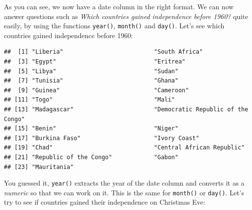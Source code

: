 \documentclass[]{gitbook}
\newenvironment{Shaded}{\begin{snugshade}}{\end{snugshade}}
\newcommand{\DecValTok}[1]{\textcolor[rgb]{0.00,0.00,0.81}{#1}}
\newcommand{\KeywordTok}[1]{\textcolor[rgb]{0.13,0.29,0.53}{\textbf{#1}}}
\newcommand{\NormalTok}[1]{#1}
\newcommand{\OperatorTok}[1]{\textcolor[rgb]{0.81,0.36,0.00}{\textbf{#1}}}
\newcommand{\StringTok}[1]{\textcolor[rgb]{0.31,0.60,0.02}{#1}}
\begin{document}
As you can see, we now have a date column in the right format. We can now answer questions such as
\emph{Which countries gained independence before 1960?} quite easily, by using the functions \texttt{year()},
\texttt{month()} and \texttt{day()}. Let's see which countries gained independence before 1960:

\begin{Shaded}
\end{Shaded}

\begin{verbatim}
##  [1] "Liberia"                          "South Africa"                    
##  [3] "Egypt"                            "Eritrea"                         
##  [5] "Libya"                            "Sudan"                           
##  [7] "Tunisia"                          "Ghana"                           
##  [9] "Guinea"                           "Cameroon"                        
## [11] "Togo"                             "Mali"                            
## [13] "Madagascar"                       "Democratic Republic of the Congo"
## [15] "Benin"                            "Niger"                           
## [17] "Burkina Faso"                     "Ivory Coast"                     
## [19] "Chad"                             "Central African Republic"        
## [21] "Republic of the Congo"            "Gabon"                           
## [23] "Mauritania"
\end{verbatim}

You guessed it, \texttt{year()} extracts the year of the date column and converts it as a \emph{numeric} so that we can work
on it. This is the same for \texttt{month()} or \texttt{day()}. Let's try to see if countries gained their independence on
Christmas Eve:

\begin{Shaded}
\end{Shaded}
\end{document}
